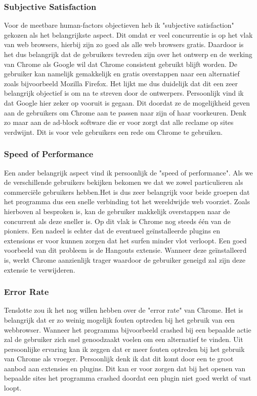 \documentclass[12pt]{article}
\begin{document}
\subsubsection{Subjective Satisfaction}
Voor de meetbare human-factors objectieven heb ik "subjective satisfaction" gekozen als het belangrijkste aspect. Dit omdat er veel concurrentie is op het vlak van web browsers, hierbij zijn zo goed als alle web browsers gratis. Daardoor is het dus belangrijk dat de gebruikers tevreden zijn over het ontwerp en de werking van Chrome als Google wil dat Chrome consistent gebruikt blijft worden. De gebruiker kan namelijk gemakkelijk en gratis overstappen naar een alternatief zoals bijvoorbeeld Mozilla Firefox. Het lijkt me dus duidelijk dat dit een zeer belangrijk objectief is om na te streven door de ontwerpers. Persoonlijk vind ik dat Google hier zeker op vooruit is gegaan. Dit doordat ze de mogelijkheid geven aan de gebruikers om Chrome aan te passen naar zijn of haar voorkeuren. Denk zo maar aan de ad-block software die er voor zorgt dat alle reclame op sites verdwijnt. Dit is voor vele gebruikers een rede om Chrome te gebruiken. 
\subsubsection{Speed of Performance}
Een ander belangrijk aspect vind ik persoonlijk de "speed of performance". Als we de verschillende gebruikers bekijken bekomen we dat we zowel particulieren als commerciële gebruikers hebben.Het is dus zeer belangrijk voor beide groepen dat het programma dus een snelle verbinding tot het wereldwijde web voorziet. Zoals hierboven al besproken is, kan de gebruiker makkelijk overstappen naar de concurrent als deze sneller is. Op dit vlak is Chrome nog steeds één van de pioniers. Een nadeel is echter dat de eventueel geïnstalleerde plugins en extensions er voor kunnen zorgen dat het surfen minder vlot verloopt. Een goed voorbeeld van dit probleem is de Hangouts extensie. Wanneer deze geïnstalleerd is, werkt Chrome aanzienlijk trager waardoor de gebruiker geneigd zal zijn deze extensie te verwijderen.
\subsubsection{Error Rate}
Tenslotte zou ik het nog willen hebben over de "error rate" van Chrome. Het is belangrijk dat er zo weinig mogelijk fouten optreden bij het gebruik van een webbrowser. Wanneer het programma bijvoorbeeld crashed bij een bepaalde actie zal de gebruiker zich snel genoodzaakt voelen om een alternatief te vinden. Uit persoonlijke ervaring kan ik zeggen dat er meer fouten optreden bij het gebruik van Chrome als vroeger. Persoonlijk denk ik dat dit komt door een te groot aanbod aan extensies en plugins. Dit kan er voor zorgen dat bij het openen van bepaalde sites het programma crashed doordat een plugin niet goed werkt of vast loopt.
\end{document}
